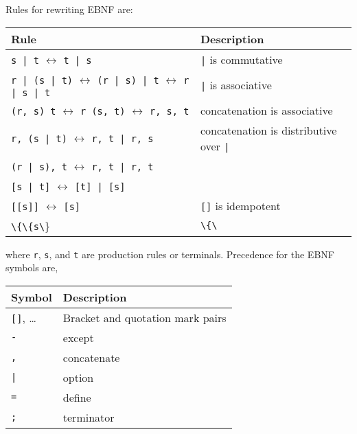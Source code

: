 Rules for rewriting EBNF are:
\begin{center}
  \begin{tabularx}{\linewidth}{|l|X|}
    \hline
    \rowcolor{headerRowColor} Rule & Description\\
    \hline
    \lstinline[language=ebnf]{s | t} $\leftrightarrow$ \lstinline[language=ebnf]{t | s} & \lstinline[language=ebnf]{|} is commutative \\
    \hline
    \lstinline[language=ebnf]{r | (s | t)} $\leftrightarrow$ \lstinline[language=ebnf]{(r | s) | t} $\leftrightarrow$ \lstinline[language=ebnf]{r | s | t} & \lstinline[language=ebnf]{|} is associative \\
    \hline
    \lstinline[language=ebnf]{(r, s) t} $\leftrightarrow$ \lstinline[language=ebnf]{r (s, t)} $\leftrightarrow$ \lstinline[language=ebnf]{r, s, t} & concatenation is associative \\
    \hline
    \lstinline[language=ebnf]{r, (s | t)} $\leftrightarrow$ \lstinline[language=ebnf]{r, t | r, s} & concatenation is distributive over \lstinline[language=ebnf]{|}\\
    \lstinline[language=ebnf]{(r | s), t} $\leftrightarrow$ \lstinline[language=ebnf]{r, t | r, t} &\\
    \hline
    \lstinline[language=ebnf]{[s | t]} $\leftrightarrow$ \lstinline[language=ebnf]{[t] | [s]} &\\
    \hline
    \lstinline[language=ebnf]{[[s]]} $\leftrightarrow$ \lstinline[language=ebnf]{[s]} & \lstinline[language=ebnf]{[]} is idempotent \\
    \hline
    \lstinline[language=ebnf]{\{\{s\}\}} $\leftrightarrow$ \lstinline[language=ebnf]{\{s\}} & \lstinline[language=ebnf]{\{\}} is idempotent \\
    \hline
  \end{tabularx}
\end{center}
where \lstinline[language=ebnf]{r}, \lstinline[language=ebnf]{s}, and \lstinline[language=ebnf]{t} are production rules or terminals. Precedence for the EBNF symbols are,
\begin{center}
  \begin{tabular}{|l|l|}
    \hline
    \rowcolor{headerRowColor} Symbol & Description\\
    \hline
    \lstinline[language=ebnf]![]!, \ldots & Bracket and quotation mark pairs\\
    \hline
    \lstinline[language=ebnf]!-! & except\\
    \hline
    \lstinline[language=ebnf]!,! & concatenate\\
    \hline
    \lstinline[language=ebnf]!|! & option\\
    \hline
    \lstinline[language=ebnf]!=! & define\\
    \hline
    \lstinline[language=ebnf]!;! & terminator\\
    \hline
  \end{tabular}
\end{center}
